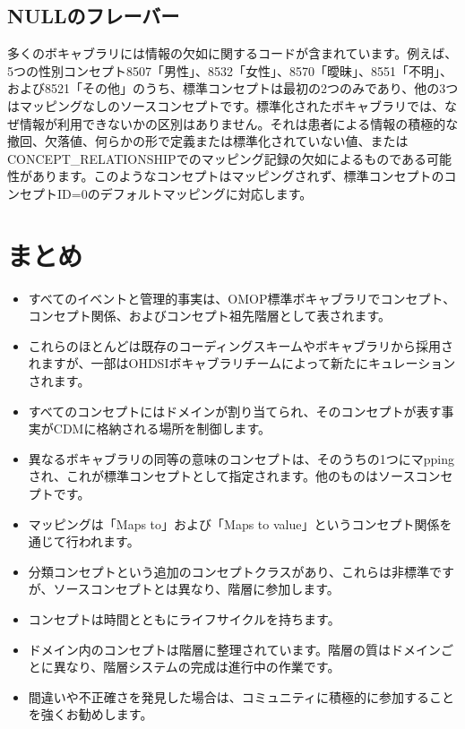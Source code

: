 \documentclass[
  11pt]{book}
\makeatletter
\providecommand{\tightlist}{%
  \setlength{\itemsep}{0pt}\setlength{\parskip}{0pt}}
\newenvironment{kframe}{%
\medskip{}
\setlength{\fboxsep}{.8em}
 \def\at@end@of@kframe{}%
 \ifinner\ifhmode%
  \def\at@end@of@kframe{\end{minipage}}%
  \begin{minipage}{\columnwidth}%
 \fi\fi%
 \def\FrameCommand##1{\hskip\@totalleftmargin \hskip-\fboxsep
 \colorbox{myShadeColor}{##1}\hskip-\fboxsep
     \hskip-\linewidth \hskip-\@totalleftmargin \hskip\columnwidth}%
 \MakeFramed {\advance\hsize-\width
   \@totalleftmargin\z@ \linewidth\hsize
   \@setminipage}}%
 {\par\unskip\endMakeFramed%
 \at@end@of@kframe}
\newenvironment{rmdblock}[1]
  {
  \begin{itemize}
  \renewcommand{\labelitemi}{
    \raisebox{-.7\height}[0pt][0pt]{
      {\setkeys{Gin}{width=3em,keepaspectratio}\texttt{[image: images/\#1]}}
    }
  }
  \setlength{\fboxsep}{1em}
  \begin{kframe}
  \item
  }
  {
  \end{kframe}
  \end{itemize}
  }
\newenvironment{rmdsummary}
  {\begin{rmdblock}{summary}}
  {\end{rmdblock}}
\theoremstyle{definition}
\theoremstyle{definition}
\theoremstyle{definition}
\theoremstyle{definition}
\theoremstyle{remark}
\makeatother
\begin{document}
\subsection{NULLのフレーバー}\label{nullux306eux30d5ux30ecux30fcux30d0ux30fc}

多くのボキャブラリには情報の欠如に関するコードが含まれています。例えば、5つの性別コンセプト8507「男性」、8532「女性」、8570「曖昧」、8551「不明」、および8521「その他」のうち、標準コンセプトは最初の2つのみであり、他の3つはマッピングなしのソースコンセプトです。標準化されたボキャブラリでは、なぜ情報が利用できないかの区別はありません。それは患者による情報の積極的な撤回、欠落値、何らかの形で定義または標準化されていない値、またはCONCEPT\_RELATIONSHIPでのマッピング記録の欠如によるものである可能性があります。このようなコンセプトはマッピングされず、標準コンセプトのコンセプトID=0のデフォルトマッピングに対応します。

\section{まとめ}\label{ux307eux3068ux3081-3}

\begin{rmdsummary}
\begin{itemize}
\tightlist
\item
  すべてのイベントと管理的事実は、OMOP標準ボキャブラリでコンセプト、コンセプト関係、およびコンセプト祖先階層として表されます。
\item
  これらのほとんどは既存のコーディングスキームやボキャブラリから採用されますが、一部はOHDSIボキャブラリチームによって新たにキュレーションされます。
\item
  すべてのコンセプトにはドメインが割り当てられ、そのコンセプトが表す事実がCDMに格納される場所を制御します。
\item
  異なるボキャブラリの同等の意味のコンセプトは、そのうちの1つにマppingされ、これが標準コンセプトとして指定されます。他のものはソースコンセプトです。
\item
  マッピングは「Maps to」および「Maps to value」というコンセプト関係を通じて行われます。
\item
  分類コンセプトという追加のコンセプトクラスがあり、これらは非標準ですが、ソースコンセプトとは異なり、階層に参加します。
\item
  コンセプトは時間とともにライフサイクルを持ちます。
\item
  ドメイン内のコンセプトは階層に整理されています。階層の質はドメインごとに異なり、階層システムの完成は進行中の作業です。
\item
  間違いや不正確さを発見した場合は、コミュニティに積極的に参加することを強くお勧めします。
\end{itemize}
\end{rmdsummary}
\end{document}
